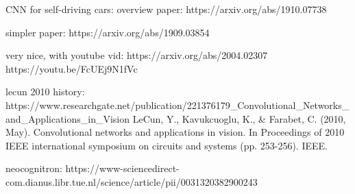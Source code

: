 

CNN for self-driving cars:
overview paper:
https://arxiv.org/abs/1910.07738

simpler paper:
https://arxiv.org/abs/1909.03854

very nice, with youtube vid:
https://arxiv.org/abs/2004.02307
https://youtu.be/FcUEj9N1fVc




lecun 2010 history:
https://www.researchgate.net/publication/221376179_Convolutional_Networks_and_Applications_in_Vision
LeCun, Y., Kavukcuoglu, K., & Farabet, C. (2010, May). Convolutional networks and applications in vision. In Proceedings of 2010 IEEE international symposium on circuits and systems (pp. 253-256). IEEE.



neocognitron:
https://www-sciencedirect-com.dianus.libr.tue.nl/science/article/pii/0031320382900243

